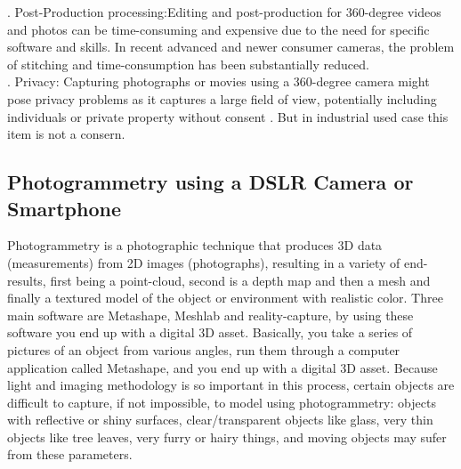 . Post-Production processing:Editing and post-production for 360-degree videos and photos can be time-consuming and expensive due to the need for specific software and skills. In recent advanced and newer consumer cameras, the problem of stitching and time-consumption has been substantially reduced.   \\

. Privacy: Capturing photographs or movies using a 360-degree camera might pose privacy problems as it captures a large field of view, potentially including individuals or private property without consent \cite{karkhanis2023complete}. But in industrial used case this item is not a consern. 



\subsection{Photogrammetry using a DSLR Camera or Smartphone}

\noindent Photogrammetry is a photographic technique that produces 3D data (measurements) from 2D images (photographs), resulting in a variety of end-results, first being a point-cloud, second is a depth map and then a mesh and finally a textured model of the object or environment with realistic color. Three main software are Metashape, Meshlab and reality-capture, by using these software you end up with a digital 3D asset.   Basically, you take a series of pictures of an object from various angles, run them through a computer application called Metashape, and you end up with a digital 3D asset. Because light and imaging methodology is so important in this process, certain objects are difficult to capture, if not impossible, to model using photogrammetry: objects with reflective or shiny surfaces, clear/transparent objects like glass, very thin objects like tree leaves, very furry or hairy things, and moving objects may sufer from these parameters\cite{PhotogrammetryWorkflowusingaDSLRCamera}.

